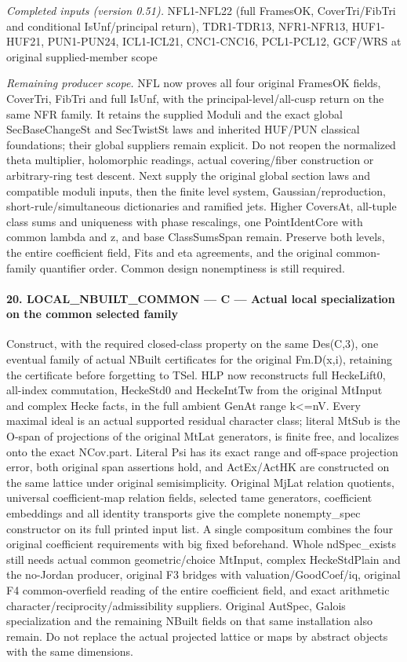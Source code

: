 \documentclass[11pt,a4paper]{article}
\numberwithin{equation}{section}
\theoremstyle{remark}\newtheorem{remark}[theorem]{Remark}
\begin{document}
\emph{Completed inputs (version 0.51).} NFL1-NFL22 (full FramesOK, CoverTri/FibTri and conditional IsUnf/principal return), TDR1-TDR13, NFR1-NFR13, HUF1-HUF21, PUN1-PUN24, ICL1-ICL21, CNC1-CNC16, PCL1-PCL12, GCF/WRS at original supplied-member scope

\emph{Remaining producer scope.} NFL now proves all four original FramesOK fields, CoverTri, FibTri and full IsUnf, with the principal-level/all-cusp return on the same NFR family. It retains the supplied Moduli and the exact global SecBaseChangeSt and SecTwistSt laws and inherited HUF/PUN classical foundations; their global suppliers remain explicit. Do not reopen the normalized theta multiplier, holomorphic readings, actual covering/fiber construction or arbitrary-ring test descent. Next supply the original global section laws and compatible moduli inputs, then the finite level system, Gaussian/reproduction, short-rule/simultaneous dictionaries and ramified jets. Higher CoversAt, all-tuple class sums and uniqueness with phase rescalings, one PointIdentCore with common lambda and z, and base ClassSumsSpan remain. Preserve both levels, the entire coefficient field, Fits and eta agreements, and the original common-family quantifier order. Common design nonemptiness is still required.



\paragraph{20. LOCAL\_\allowbreak NBUILT\_\allowbreak COMMON — C — Actual local specialization on the common selected family}

Construct, with the required closed-class property on the same Des(C,3), one eventual family of actual NBuilt certificates for the original Fm.D(x,i), retaining the certificate before forgetting to TSel. HLP now reconstructs full HeckeLift0, all-index commutation, HeckeStd0 and HeckeIntTw from the original MtInput and complex Hecke facts, in the full ambient GenAt range k<=nV. Every maximal ideal is an actual supported residual character class; literal MtSub is the O-span of projections of the original MtLat generators, is finite free, and localizes onto the exact NCov.part. Literal Psi has its exact range and off-space projection error, both original span assertions hold, and ActEx/ActHK are constructed on the same lattice under original semisimplicity. Original MjLat relation quotients, universal coefficient-map relation fields, selected tame generators, coefficient embeddings and all identity transports give the complete nonempty\_\allowbreak spec constructor on its full printed input list. A single compositum combines the four original coefficient requirements with big fixed beforehand. Whole ndSpec\_\allowbreak exists still needs actual common geometric/choice MtInput, complex HeckeStdPlain and the no-Jordan producer, original F3 bridges with valuation/GoodCoef/iq, original F4 common-overfield reading of the entire coefficient field, and exact arithmetic character/reciprocity/admissibility suppliers. Original AutSpec, Galois specialization and the remaining NBuilt fields on that same installation also remain. Do not replace the actual projected lattice or maps by abstract objects with the same dimensions.
\end{document}
